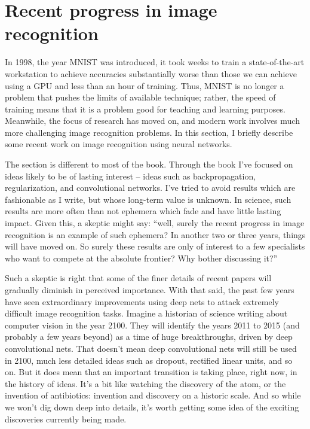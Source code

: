 \documentclass[a4paper,twoside,10pt]{book}
\begin{document}
\section{Recent progress in image recognition}
In 1998, the year MNIST was introduced, it took weeks to train a state-of-the-art workstation to achieve accuracies substantially worse than those we can achieve using a GPU and less than an hour of training. Thus, MNIST is no longer a problem that pushes the limits of available technique; rather, the speed of training means that it is a problem good for teaching and learning purposes. Meanwhile, the focus of research has moved on, and modern work involves much more challenging image recognition problems. In this section, I briefly describe some recent work on image recognition using neural networks.

The section is different to most of the book. Through the book I've focused on ideas likely to be of lasting interest -- ideas such as backpropagation, regularization, and convolutional networks. I've tried to avoid results which are fashionable as I write, but whose long-term value is unknown. In science, such results are more often than not ephemera which fade and have little lasting impact. Given this, a skeptic might say: ``well, surely the recent progress in image recognition is an example of such ephemera? In another two or three years, things will have moved on. So surely these results are only of interest to a few specialists who want to compete at the absolute frontier? Why bother discussing it?''

Such a skeptic is right that some of the finer details of recent papers will gradually diminish in perceived importance. With that said, the past few years have seen extraordinary improvements using deep nets to attack extremely difficult image recognition tasks. Imagine a historian of science writing about computer vision in the year 2100. They will identify the years 2011 to 2015 (and probably a few years beyond) as a time of huge breakthroughs, driven by deep convolutional nets. That doesn't mean deep convolutional nets will still be used in 2100, much less detailed ideas such as dropout, rectified linear units, and so on. But it does mean that an important transition is taking place, right now, in the history of ideas. It's a bit like watching the discovery of the atom, or the invention of antibiotics: invention and discovery on a historic scale. And so while we won't dig down deep into details, it's worth getting some idea of the exciting discoveries currently being made.
\end{document}
